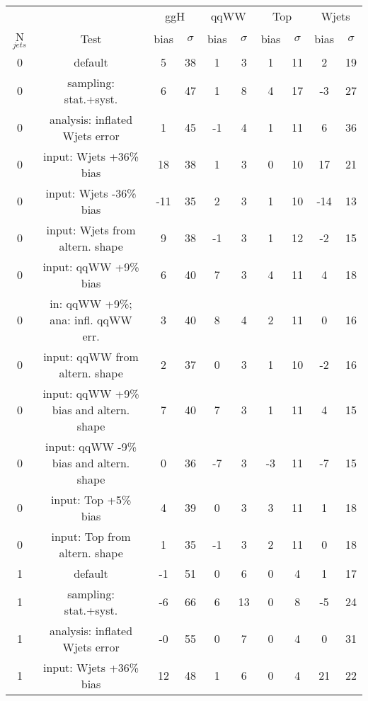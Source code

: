 \begin{table}
\begin{center}
\begin{tabular}{c | c  | c c | c c | c c | c c}
\hline
          &      & \multicolumn{2}{c|}{ggH} & \multicolumn{2}{c|}{qqWW} & \multicolumn{2}{c|}{Top} & \multicolumn{2}{c}{Wjets} \\
N$_{jets}$ & Test & bias & $\sigma$ & bias & $\sigma$ & bias & $\sigma$ & bias & $\sigma$ \\
\hline
0 & default                             & 5  & 38 & 1 & 3 & 1 & 11 & 2  & 19 \\
0 & sampling: stat.+syst.               & 6  & 47 & 1 & 8 & 4 & 17 &-3  & 27 \\
\hline
0 & analysis: inflated Wjets error      & 1  & 45 &-1 & 4 & 1 & 11 & 6  & 36 \\
0 & input: Wjets +36\% bias             & 18 & 38 & 1 & 3 & 0 & 10 & 17 & 21 \\
0 & input: Wjets -36\% bias             &-11 & 35 & 2 & 3 & 1 & 10 &-14 & 13 \\
0 & input: Wjets from altern. shape     & 9  & 38 &-1 & 3 & 1 & 12 &-2  & 15 \\
\hline
0 & input: qqWW +9\% bias               & 6  & 40 & 7 & 3 & 4 & 11 & 4  & 18 \\
0 & in: qqWW +9\%; ana: infl. qqWW err. & 3  & 40 & 8 & 4 & 2 & 11 & 0  & 16 \\
0 & input: qqWW from altern. shape      & 2  & 37 & 0 & 3 & 1 & 10 &-2  & 16 \\
0 & input: qqWW +9\% bias and altern. shape & 7  & 40 & 7 & 3 & 1 & 11 & 4  & 15 \\
0 & input: qqWW -9\% bias and altern. shape & 0  & 36 &-7 & 3 &-3 & 11 &-7  & 15 \\
\hline
0 & input: Top +5\% bias                & 4  & 39 & 0 & 3 & 3 & 11 & 1  & 18 \\
0 & input: Top from altern. shape       & 1  & 35 &-1 & 3 & 2 & 11 & 0  & 18 \\
\hline
\hline
1 & default                             &-1  & 51 & 0 & 6  & 0 & 4 & 1  & 17 \\
1 & sampling: stat.+syst.               &-6  & 66 & 6 & 13 & 0 & 8 &-5  & 24 \\
\hline
1 & analysis: inflated Wjets error      &-0  & 55 & 0 & 7  & 0 & 4 & 0  & 31 \\
1 & input: Wjets +36\% bias             & 12 & 48 & 1 & 6  & 0 & 4 & 21 & 22 \\

\end{tabular}
\end{center}
\end{table}
